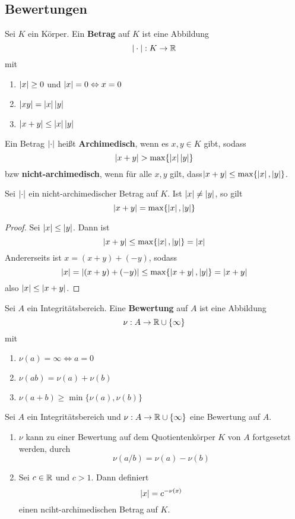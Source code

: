 	
	
	\subsection{Bewertungen}
	\begin{definition}
		Sei $K$ ein Körper. Ein \textbf{Betrag} auf $K$ ist eine Abbildung
		\[|\cdot|:K\to\mathbb{R}\] mit
		\begin{enumerate}
			\item $\left|x\right|\geq 0$ und $\left|x\right|=0\Leftrightarrow x=0$
			\item $\left|xy\right|=\left|x\right|\left|y\right|$
			\item $\left|x+y\right|\leq \left|x\right|\left|y\right|$
		\end{enumerate}
	\end{definition}
	\begin{definition}
		Ein Betrag $\left|\cdot\right|$ heißt \textbf{Archimedisch}, wenn es $x,y\in K$ gibt, sodass
		\[\abs{x+y}>\max\{\abs x\abs y\}\]
		bzw \textbf{nicht-archimedisch}, wenn für alle $x,y$ gilt, dass$|x+y|\leq \max\{\left|x\right|,\left|y\right|\}$.
	\end{definition}

	\begin{satz}
		Sei $\left|\cdot\right|$ ein  nicht-archimedischer Betrag auf $K$. Ist $\left|x\right|\neq \left|y\right|$, so gilt
		\[\left|x+y\right|=\max\{\left|x\right|,\left|y\right|\}\]
	\end{satz}
	\begin{proof}
		Sei $\left|x\right|\leq \left|y\right|$. Dann ist 
		\[\left|x+y\right|\leq\max\{\left|x\right|,\left|y\right|\}=\left|x\right|\]
		Andererseits ist $x=(x+y)+(-y)$, sodass
		\[\left|x\right|=\left|(x+y)+(-y)\right|\leq\max\{\left|x+y\right|,\left|y\right|\}=\left|x+y\right|\]
		also $\left|x\right|\leq\left|x+y\right|$.
	\end{proof}

	\begin{definition}
		Sei $A$ ein Integritätsbereich. Eine \textbf{Bewertung} auf $A$ ist eine Abbildung
		\[\nu:A\to\mathbb{R}\cup\{\infty\}\]
		mit
		\begin{enumerate}
			\item $\nu(a)=\infty\Leftrightarrow a=0$
			\item $\nu(ab)=\nu(a)+\nu(b)$
			\item $\nu(a+b)\geq\min\{\nu(a),\nu(b)\}$
		\end{enumerate}
	\end{definition}

	\begin{satz}
		Sei $A$ ein Integritätsbereich und $\nu:A\to\mathbb{R}\cup\{\infty\}$ eine Bewertung auf $A$.
		\begin{enumerate}
			\item $\nu$ kann zu einer Bewertung auf dem Quotientenkörper $K$ von $A$ fortgesetzt werden, durch
			\[\nu(a/b)=\nu(a)-\nu(b)\]
			\item Sei $c\in\mathbb{R}$ und $c> 1$. Dann definiert
			\[\left|x\right|=c^{-\nu(x)}\]
			einen nciht-archimedischen Betrag auf $K$.
		\end{enumerate}
	\end{satz}

